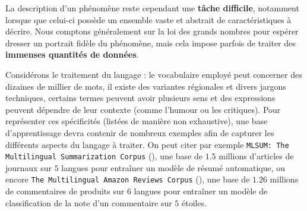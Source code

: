 			La description d'un phénomène reste cependant une \textbf{tâche difficile}, notamment lorsque que celui-ci possède un ensemble vaste et abstrait de caractéristiques à décrire.
			Nous comptons généralement sur la loi des grands nombres pour espérer dresser un portrait fidèle du phénomène, mais cela impose parfois de traiter des \textbf{immenses quantités de données}.
			\begin{leftBarExamples}
				Considérons le traitement du langage : le vocabulaire employé peut concerner des dizaines de millier de mots, il existe des variantes régionales et divers jargons techniques, certains termes peuvent avoir plusieurs sens et des expressions peuvent dépendre de leur contexte (comme l'humour ou les critiques).
				Pour représenter ces spécificités (listées de manière non exhaustive), une base d'apprentissage devra contenir de nombreux exemples afin de capturer les différents aspects du langage à traiter.
				On peut citer par exemple \texttt{MLSUM: The Multilingual Summarization Corpus} (\cite{scialom-etal:2020:mlsum-multilingual-summarization}), une base de $1.5$ millions d'articles de journaux sur $5$ langues pour entraîner un modèle de résumé automatique, ou encore \texttt{The Multilingual Amazon Reviews Corpus} (\cite{keung-etal:2020:multilingual-amazon-reviewsa}), une base de $1.26$ millions de commentaires de produits sur $6$ langues pour entraîner un modèle de classification de la note d'un commentaire sur $5$ étoiles.
			\end{leftBarExamples}
			
